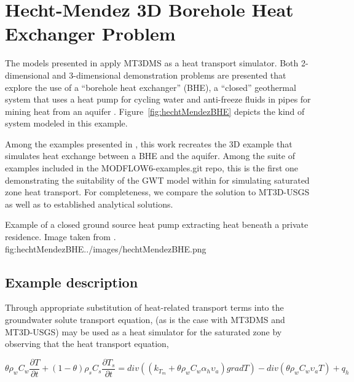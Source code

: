 \section{Hecht-Mendez 3D Borehole Heat Exchanger Problem}

The models presented in \cite{hechtMendez2010} apply MT3DMS \cite{zheng1999mt3dms} as a heat transport simulator.  Both 2-dimensional and 3-dimensional demonstration problems are presented that explore the use of a ``borehole heat exchanger'' (BHE), a ``closed'' geothermal system that uses a heat pump for cycling water and anti-freeze fluids in pipes for mining heat from an aquifer \cite{diao2004}.  Figure~\ref{fig:hechtMendezBHE} depicts the kind of system modeled in this example.  

Among the examples presented in \cite{hechtMendez2010}, this work recreates the 3D example that simulates heat exchange between a BHE and the aquifer.  Among the suite of examples included in the MODFLOW6-examples.git repo, this is the first one demonstrating the suitability of the GWT model within \mf for simulating saturated zone heat transport.  For completeness, we compare the \mf solution to MT3D-USGS \cite{mt3dusgs} as well as to established analytical solutions.

\begin{StandardFigure}{
                                     Example of a closed ground source heat pump extracting heat beneath a private residence.  Image taken from \cite{hecht2008}.
                                     }{fig:hechtMendezBHE}{../images/hechtMendezBHE.png}
\end{StandardFigure}       

\subsection{Example description}

Through appropriate substitution of heat-related transport terms into the groundwater solute transport equation, \mf (as is the case with MT3DMS and MT3D-USGS) may be used as a heat simulator for the saturated zone by observing that the heat transport equation, 

\begin{equation*}
\theta \rho_w C_w \frac{\partial T}{\partial t} + \left( 1 - \theta \right) \rho_s C_s \frac{\partial  T_s}{\partial t} = div \left( \left( k_{T_m} + \theta \rho_w C_w \alpha_h \upsilon_a \right) grad T\right) - div \left( \theta \rho_w C_w \upsilon_a T \right) + q_h
\end{equation*}

